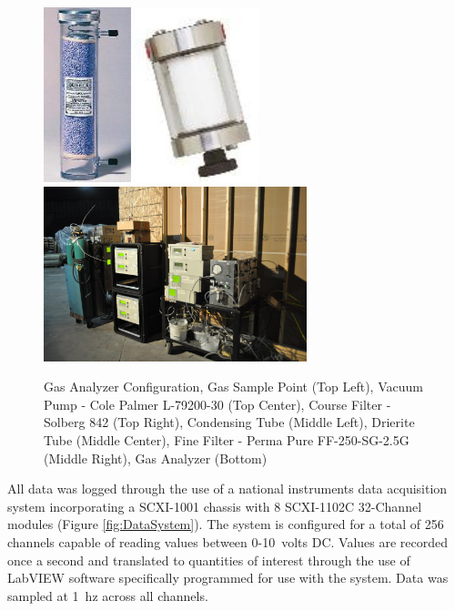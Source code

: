 \documentclass[12pt,oneside]{book}
\begin{document}
\begin{figure}[H]
	\includegraphics[height = 2in]{0_Images/Instrumentation/Gas_Analyzer/DriRightTube.jpg}	\hspace{0.1\textwidth}
	\includegraphics[height = 2in]{0_Images/Instrumentation/Gas_Analyzer/FineFilter.jpg} \\
	\includegraphics[height = 2in]{0_Images/Instrumentation/Gas_Analyzer/GasAnalyzers.jpg}
	\caption[Gas Analyzer Configuration]{Gas Analyzer Configuration, Gas Sample Point (Top Left), Vacuum Pump - Cole Palmer L-79200-30 (Top Center), Course Filter - Solberg 842 (Top Right), Condensing Tube (Middle Left), Drierite Tube (Middle Center), Fine Filter - Perma Pure FF-250-SG-2.5G (Middle Right), Gas Analyzer (Bottom)}
	\label{fig:GasAnalyzers}
\end{figure}

All data was logged through the use of a national instruments data acquisition system incorporating a SCXI-1001 chassis with 8 SCXI-1102C 32-Channel modules (Figure \ref{fig:DataSystem}). The system is configured for a total of 256 channels capable of reading values between 0-10~volts DC. Values are recorded once a second and translated to quantities of interest through the use of LabVIEW software specifically programmed for use with the system. Data was sampled at 1~hz across all channels.
\end{document}

